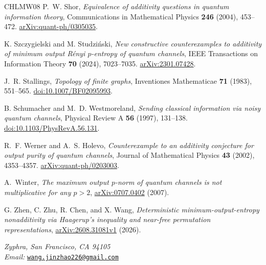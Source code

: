 \documentclass[11pt]{article}
\numberwithin{equation}{section}
\theoremstyle{boldremark}\newtheorem{remark}[theorem]{Remark}
\begin{document}
\begin{thebibliography}{CHLMW08}
P.~W. Shor,
\emph{Equivalence of additivity questions in quantum information theory},
Communications in Mathematical Physics \textbf{246} (2004), 453--472.
\href{https://arxiv.org/abs/quant-ph/0305035}{arXiv:quant-ph/0305035}.

K. Szczygielski and M. Studzi\'nski,
\emph{New constructive counterexamples to additivity of minimum output R\'enyi $p$-entropy of quantum channels},
IEEE Transactions on Information Theory \textbf{70} (2024), 7023--7035.
\href{https://arxiv.org/abs/2301.07428}{arXiv:2301.07428}.

J.~R. Stallings,
\emph{Topology of finite graphs},
Inventiones Mathematicae \textbf{71} (1983), 551--565.
\href{https://doi.org/10.1007/BF02095993}{doi:10.1007/BF02095993}.

B. Schumacher and M.~D. Westmoreland,
\emph{Sending classical information via noisy quantum channels},
Physical Review A \textbf{56} (1997), 131--138.
\href{https://doi.org/10.1103/PhysRevA.56.131}{doi:10.1103/PhysRevA.56.131}.

R.~F. Werner and A.~S. Holevo,
\emph{Counterexample to an additivity conjecture for output purity of quantum channels},
Journal of Mathematical Physics \textbf{43} (2002), 4353--4357.
\href{https://arxiv.org/abs/quant-ph/0203003}{arXiv:quant-ph/0203003}.

A.~Winter,
\emph{The maximum output $p$-norm of quantum channels is not multiplicative
for any $p>2$},
\href{https://arxiv.org/abs/0707.0402}{arXiv:0707.0402} (2007).

G. Zhen, C. Zhu, R. Chen, and X. Wang,
\emph{Deterministic minimum-output-entropy nonadditivity via Haagerup's
inequality and near-free permutation representations},
\href{https://arxiv.org/abs/2608.31081v1}{arXiv:2608.31081v1} (2026).

\end{thebibliography}

\smallskip
\noindent\begin{minipage}{\textwidth}
\textit{Zyphra, San Francisco, CA 94105}\\
\textit{Email:} \href{mailto:wang.jinzhao226@gmail.com}{\texttt{wang.jinzhao226@gmail.com}}
\end{minipage}
\end{document}
